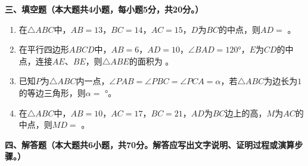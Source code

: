\documentclass[12pt, a4paper]{ctexart}
\begin{document}
\vspace{0.5em}

\noindent\textbf{三、填空题（本大题共4小题，每小题5分，共20分。）}

\begin{enumerate}[label=\arabic*.]

\item 在$\triangle ABC$中，$AB=13$，$BC=14$，$AC=15$，$D$为$BC$的中点，则$AD=$ \underline{\hspace{3cm}}。

\item 在平行四边形$ABCD$中，$AB=6$，$AD=10$，$\angle BAD=120°$，$E$为$CD$的中点，连接$AE$、$BE$，则$\triangle ABE$的面积为 \underline{\hspace{3cm}}。

\item 已知$P$为$\triangle ABC$内一点，$\angle PAB = \angle PBC = \angle PCA = \alpha$，若$\triangle ABC$为边长为$1$的等边三角形，则$\alpha =$ \underline{\hspace{3cm}}°。

\item 在$\triangle ABC$中，$AB=10$，$AC=17$，$BC=21$，$AD$为$BC$边上的高，$M$为$AC$的中点，则$MD=$ \underline{\hspace{3cm}}。

\end{enumerate}

\vspace{0.5em}

\noindent\textbf{四、解答题（本大题共6小题，共70分。解答应写出文字说明、证明过程或演算步骤。）}
\end{document}

